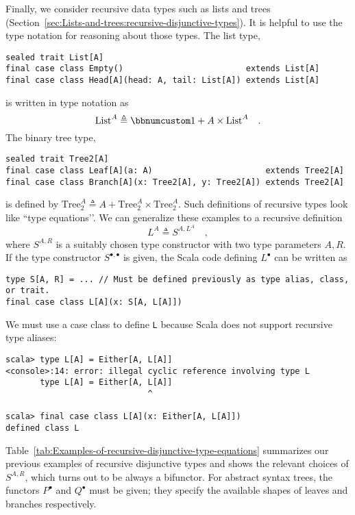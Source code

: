 Finally, we consider recursive data types such as lists and trees
(Section~\ref{sec:Lists-and-trees:recursive-disjunctive-types}).
It is helpful to use the type notation for reasoning about those types.
The list type,
\begin{lstlisting}
sealed trait List[A]
final case class Empty()                         extends List[A]
final case class Head[A](head: A, tail: List[A]) extends List[A]
\end{lstlisting}
is written in type notation as
\[
\text{List}^{A}\triangleq\bbnum 1+A\times\text{List}^{A}\quad.
\]
The binary tree type,
\begin{lstlisting}
sealed trait Tree2[A]
final case class Leaf[A](a: A)                       extends Tree2[A]
final case class Branch[A](x: Tree2[A], y: Tree2[A]) extends Tree2[A]
\end{lstlisting}
is defined by $\text{Tree}_{2}^{A}\triangleq A+\text{Tree}_{2}^{A}\times\text{Tree}_{2}^{A}$.
Such definitions of recursive types look like \textsf{``}type equations\textsf{'}'.
We can generalize these examples to a recursive definition
\begin{equation}
L^{A}\triangleq S^{A,L^{A}}\quad,\label{eq:f-def-recursive-functor}
\end{equation}
where $S^{A,R}$ is a suitably chosen type constructor with two type
parameters $A,R$. If the type constructor $S^{\bullet,\bullet}$
is given, the Scala code defining $L^{\bullet}$ can be written as
\begin{lstlisting}
type S[A, R] = ... // Must be defined previously as type alias, class, or trait.
final case class L[A](x: S[A, L[A]])
\end{lstlisting}
We must use a case class to define \lstinline!L! because Scala does
not support recursive type aliases:
\begin{lstlisting}
scala> type L[A] = Either[A, L[A]]
<console>:14: error: illegal cyclic reference involving type L
       type L[A] = Either[A, L[A]]
                             ^

scala> final case class L[A](x: Either[A, L[A]])
defined class L
\end{lstlisting}

Table~\ref{tab:Examples-of-recursive-disjunctive-type-equations}
summarizes our previous examples of recursive disjunctive types and
shows the relevant choices of $S^{A,R}$, which turns out to be always
a bifunctor. For abstract syntax trees, the functors $P^{\bullet}$
and $Q^{\bullet}$ must be given; they specify the available shapes
of leaves and branches respectively. 

